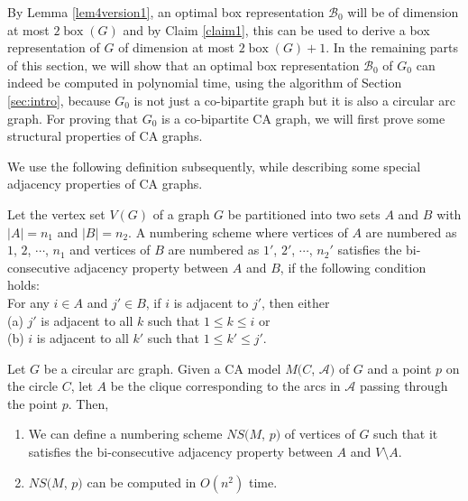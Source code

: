 By Lemma \ref{lem4version1}, an optimal box representation $\mathcal{B}_0$ will be of dimension at most $2 \operatorname{box}(G)$ and by Claim \ref{claim1}, 
this can be used to derive a box representation of $G$ of dimension at most $2 \operatorname{box}(G) +1$. In the remaining parts of this section, 
we will show that an optimal box representation $\mathcal{B}_0$ of $G_0$ can indeed be computed in polynomial time, using the algorithm of 
Section \ref{sec:intro}, because $G_0$ is not just a co-bipartite graph but it is also a circular arc graph. For proving that $G_0$ is a co-bipartite CA graph, we will first prove some structural properties of CA graphs.

We use the following definition subsequently, while describing some special adjacency properties of CA graphs.  
\begin{definition}
 Let the vertex set $V(G)$ of a graph $G$ be partitioned into two sets $A$ and $B$ with $|A|=n_1$ and $|B|=n_2$. A numbering scheme where vertices of $A$ are numbered as $1$, $2$, $\cdots$, $n_1$ and vertices of $B$ are numbered as  $1'$, $2'$, $\cdots$, $n_2'$ satisfies the bi-consecutive adjacency property between $A$ and $B$, if the following condition holds: \\ For any  $i \in A$ and $j' \in B$,  if $i$ is adjacent to $j'$, then  either \\(a) $j'$ is adjacent to all $k$ such that $1\le k \le i$  or \\(b) $i$ is adjacent to all $k'$ such that $1\le k' \le j'$. 
\end{definition}
\begin{lemma} \label{prop1}
  Let $G$ be a circular arc graph. Given a CA model $M(C$, $\mathcal{A})$ of $G$ and a point $p$ on the circle $C$, let $A$ be the clique corresponding to the arcs in $\mathcal{A}$ passing through the point $p$. Then, 
\begin{enumerate}
 \item We can define a numbering scheme $NS(M$, $p)$ of vertices of $G$ such that it satisfies the bi-consecutive adjacency property between $A$ and $V \setminus A$.  
 \item $NS(M$, $p)$ can be computed in $O(n^2)$ time.
\end{enumerate}
\end{lemma}
